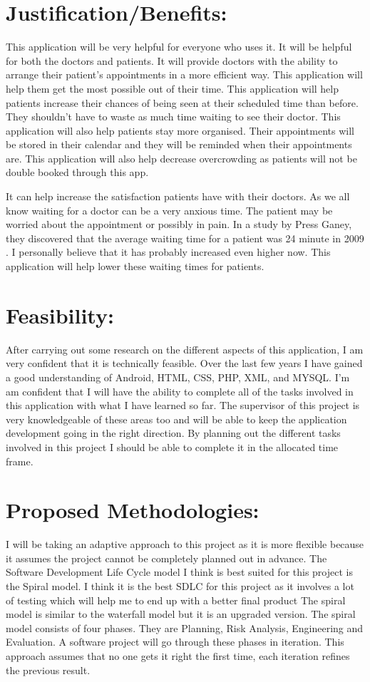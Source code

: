\documentclass[12pt,ITBthesis]{report}
\begin{document}
	\section{Justification/Benefits:}
	This application will be very helpful for everyone who uses it. It will be helpful for both the doctors and patients. It will provide doctors with the ability to arrange their patient’s appointments in a more efficient way. This application will help them get the most possible out of their time. This application will help patients increase their chances of being seen at their scheduled time than before. They shouldn’t have to waste as much time waiting to see their doctor. This application will also help patients stay more organised. Their appointments will be stored in their calendar and they will be reminded when their appointments are. This application will also help decrease overcrowding as patients will not be double booked through this app. 
	
	It can help increase the satisfaction patients have with their doctors. As we all know waiting for a doctor can be a very anxious time. The patient may be worried about the appointment or possibly in pain. In a study by Press Ganey, they discovered that the average waiting time for a patient was 24 minute in 2009 \cite{3}. I personally believe that it has probably increased even higher now. This application will help lower these waiting times for patients.
	
	\section{Feasibility:}
	After carrying out some research on the different aspects of this application, I am very confident that it is technically feasible. Over the last few years I have gained a good understanding of Android, HTML, CSS, PHP, XML, and MYSQL. I’m am confident that I will have the ability to complete all of the tasks involved in this application with what I have learned so far. The supervisor of this project is very knowledgeable of these areas too and will be able to keep the application development going in the right direction. By planning out the different tasks involved in this project I should be able to complete it in the allocated time frame.
	
	\section{Proposed Methodologies:}
	I will be taking an adaptive approach to this project as it is more flexible because it assumes the project cannot be completely planned out in advance. The Software Development Life Cycle model I think is best suited for this project is the Spiral model. I think it is the best SDLC for this project as it involves a lot of testing which will help me to end up with a better final product 
	The spiral model is similar to the waterfall model but it is an upgraded version. The spiral model consists of four phases. They are Planning, Risk Analysis, Engineering and Evaluation. A software project will go through these phases in iteration. This approach assumes that no one gets it right the first time, each iteration refines the previous result.
	
\end{document}
